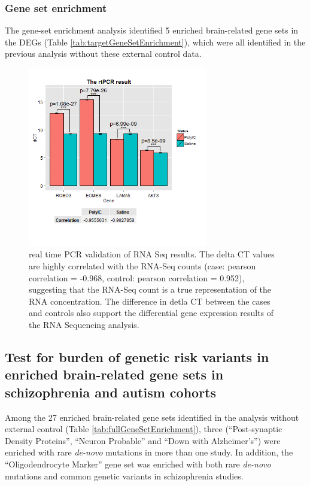 \subsubsection{Gene set enrichment}
The gene-set enrichment analysis identified 5 enriched brain-related gene sets in the DEGs (Table \ref{tab:targetGeneSetEnrichment}), which were all identified in the previous analysis without these external control data. 





\begin{figure}
	\caption[rtPCR Results]{real time PCR validation of RNA Seq results.
		The delta CT values are highly correlated with the RNA-Seq counts (case: pearson correlation = -0.968, control: pearson correlation = 0.952), suggesting that the RNA-Seq count is a true representation of the RNA concentration.
		The difference in detla CT between the cases and controls also support the differential gene expression results of the RNA Sequencing analysis.}\label{fig:rtResult}
		\vspace{-20pt}
	\begin{center}
		\includegraphics[trim=0cm 2cm 0cm 1cm, clip=true, width=0.7\textwidth]{environmental_risk/image/er_rtPCR.png}
	\end{center}
\end{figure}

\subsection{Test for burden of genetic risk variants in enriched brain-related gene sets in schizophrenia and autism cohorts }
Among the 27 enriched brain-related gene sets identified in the analysis without external control (Table \ref{tab:fullGeneSetEnrichment}), three (``Post-synaptic Density Proteins'', ``Neuron Probable'' and ``Down with Alzheimer's'') were enriched with rare \textit{de-novo} mutations in more than one study. 
In addition, the ``Oligodendrocyte Marker'' gene set was enriched with both rare \textit{de-novo} mutations and common genetic variants in schizophrenia studies. 

